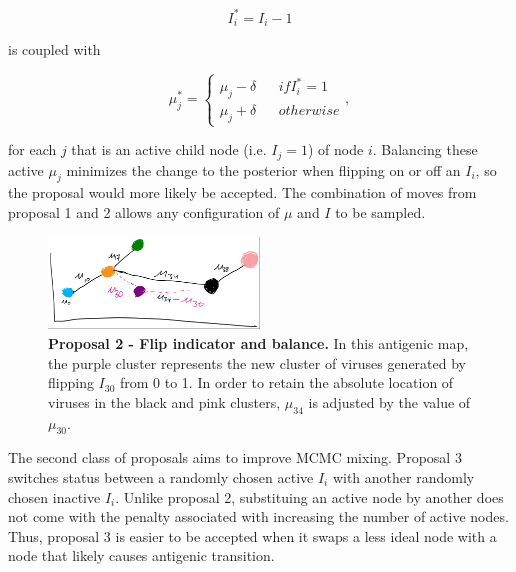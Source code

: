 \documentclass[11pt,oneside,letterpaper]{article}
\begin{document}
\begin{equation}
\label{flipI-equation}
I_i^* = I_i - 1
\end{equation}

is coupled with

\begin{equation}
\label{muBalance-equation}
	\mu_j^{*} =  \left \{
\begin{array}{lllr}
    \mu_j - \delta	&	& if I_i^{*} = 1\\
    \mu_j + \delta	& & otherwise
\end{array}
\right.
,
\end{equation}

for each $j$ that is an active child node (i.e. $I_j = 1$) of node $i$. Balancing these active $\mu_j$ minimizes the change to the posterior when flipping on or off an $I_i$, so the proposal would more likely be accepted. The combination of moves from proposal 1 and 2 allows any configuration of $\mu$ and $I$ to be sampled.



\begin{figure}[h]
	\centering		
	\includegraphics[width=0.5\textwidth]{figures/flipAndBalance}
	\caption{\textbf{Proposal 2 - Flip indicator and balance.} 
In this antigenic map, the purple cluster represents the new cluster of viruses generated by flipping $I_{30}$ from 0 to 1. In order to retain the absolute location of viruses in the black and pink clusters,  $\mu_{34}$ is adjusted by the value of $\mu_{30}$.
	} 
	\label{flipAndBalance} 
\end{figure}


The second class of proposals aims to improve MCMC mixing.
Proposal 3 switches status between a randomly chosen active $I_i$ with another randomly chosen inactive $I_i$. 
Unlike proposal 2, substituing an active node by another does not come with the penalty associated with increasing the number of active nodes.
Thus, proposal 3 is easier to be accepted when it swaps a less ideal node with a node that likely causes antigenic transition.
\end{document}

